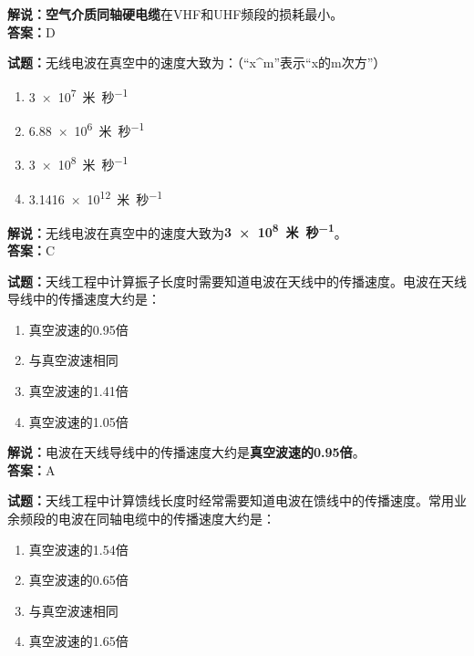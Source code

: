 \documentclass{ctexbook}
\begin{document}
\noindent\textbf{解说：}\textbf{空气介质同轴硬电缆}在VHF和UHF频段的损耗最小。\\\noindent\textbf{答案：}D

\bigskip

\noindent\textbf{试题：}无线电波在真空中的速度大致为：（“x\string^m”表示“x的m次方”）

\begin{enumerate}[leftmargin=3em]
  \item \qty{3e7}{\mbox{米}\per\mbox{秒}} %
  \item \qty{6.88e6}{\mbox{米}\per\mbox{秒}}%
  \item \qty{3e8}{\mbox{米}\per\mbox{秒}}%
  \item \qty{3.1416e12}{\mbox{米}\per\mbox{秒}}%
\end{enumerate}

\noindent\textbf{解说：}无线电波在真空中的速度大致为\textbf{\qty{3e8}{\mbox{米}\per\mbox{秒}}}。\\\noindent\textbf{答案：}C

\bigskip

\noindent\textbf{试题：}天线工程中计算振子长度时需要知道电波在天线中的传播速度。电波在天线导线中的传播速度大约是：

\begin{enumerate}[leftmargin=3em]
  \item 真空波速的\num{0.95}倍
  \item 与真空波速相同
  \item 真空波速的\num{1.41}倍
  \item 真空波速的\num{1.05}倍
\end{enumerate}

\noindent\textbf{解说：}电波在天线导线中的传播速度大约是\textbf{真空波速的\num{0.95}倍}。\\\noindent\textbf{答案：}A

\bigskip

\noindent\textbf{试题：}天线工程中计算馈线长度时经常需要知道电波在馈线中的传播速度。常用业余频段的电波在同轴电缆中的传播速度大约是：

\begin{enumerate}[leftmargin=3em]
  \item 真空波速的\num{1.54}倍
  \item 真空波速的\num{0.65}倍
  \item 与真空波速相同
  \item 真空波速的\num{1.65}倍
\end{enumerate}
\end{document}

